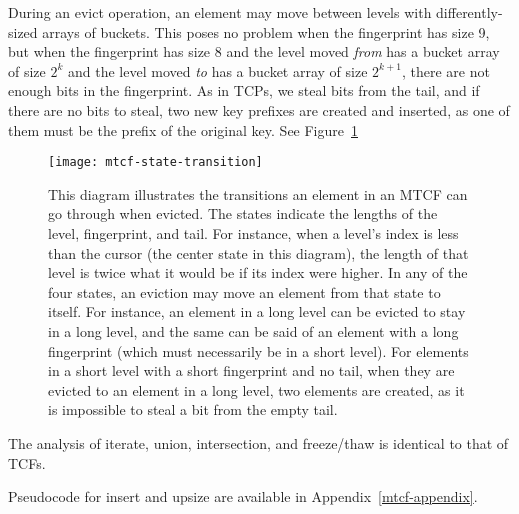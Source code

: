 \documentclass[sigconf, nonacm]{acmart}
\begin{document}

During an evict operation, an element may move between levels with differently-sized arrays of buckets.
This poses no problem when the fingerprint has size 9, but when the fingerprint has size 8 and the level moved {\em from} has a bucket array of size $2^k$ and the level moved {\em to} has a bucket array of size $2^{k+1}$, there are not enough bits in the fingerprint.
As in TCPs, we steal bits from the tail, and if there are no bits to steal, two new key prefixes are created and inserted, as one of them must be the prefix of the original key.
See Figure~\ref{mtcf-state-transition}

\begin{figure}
  \texttt{[image: mtcf-state-transition]}
\caption{\label{mtcf-state-transition}
This diagram illustrates the transitions an element in an MTCF can go through when evicted.
The states indicate the lengths of the level, fingerprint, and tail.
For instance, when a level's index is less than the cursor (the center state in this diagram), the length of that level is twice what it would be if its index were higher.
In any of the four states, an eviction may move an element from that state to itself.
For instance, an element in a long level can be evicted to stay in a long level, and the same can be said of an element with a long fingerprint (which must necessarily be in a short level).
For elements in a short level with a short fingerprint and no tail, when they are evicted to an element in a long level, two elements are created, as it is impossible to steal a bit from the empty tail.
}
\end{figure}

The analysis of iterate, union, intersection, and freeze/thaw is identical to that of TCFs.

Pseudocode for insert and upsize are available in Appendix~\ref{mtcf-appendix}.

\end{document}
